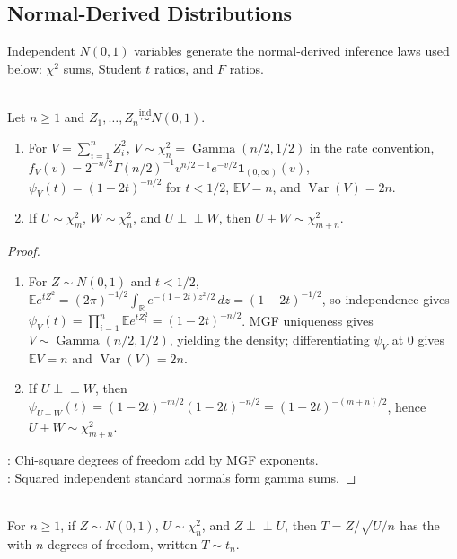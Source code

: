\subsection{Normal-Derived Distributions}

Independent $N(0,1)$ variables generate the normal-derived inference laws used below: $\chi^2$ sums, Student $t$ ratios, and $F$ ratios.

\begin{proposition} \label{prop:chi-square-normal-sums} \\
Let $n\geq1$ and $Z_1,\ldots,Z_n\overset{\mathrm{ind}}{\sim}N(0,1)$.
\begin{enumerate}[label=(\roman*)]
\setlength{\itemsep}{0pt}
\item For $V=\sum_{i=1}^nZ_i^2$, $V\sim\chi_n^2=\operatorname{Gamma}(n/2,1/2)$ in the rate convention,\\
$f_V(v)=2^{-n/2}\Gamma(n/2)^{-1}v^{n/2-1}e^{-v/2}\mathbf{1}_{(0,\infty)}(v)$,\\
$\psi_V(t)=(1-2t)^{-n/2}$ for $t<1/2$, $\mathbb{E}V=n$, and $\operatorname{Var}(V)=2n$.
\item If $U\sim\chi_m^2$, $W\sim\chi_n^2$, and $U\perp\!\!\!\perp W$, then $U+W\sim\chi_{m+n}^2$.
\end{enumerate}
\begin{proof}
\begin{enumerate}[label=(\roman*)]
\setlength{\itemsep}{0pt}
\item
For $Z\sim N(0,1)$ and $t<1/2$, $\mathbb{E}e^{tZ^2}=(2\pi)^{-1/2}\int_{\mathbb{R}}e^{-(1-2t)z^2/2}\,dz=(1-2t)^{-1/2}$, so independence gives $\psi_V(t)=\prod_{i=1}^n\mathbb{E}e^{tZ_i^2}=(1-2t)^{-n/2}$.
MGF uniqueness gives $V\sim\operatorname{Gamma}(n/2,1/2)$, yielding the density; differentiating $\psi_V$ at $0$ gives $\mathbb{E}V=n$ and $\operatorname{Var}(V)=2n$.
\item If $U\perp\!\!\!\perp W$, then $\psi_{U+W}(t)=(1-2t)^{-m/2}(1-2t)^{-n/2}=(1-2t)^{-(m+n)/2}$, hence $U+W\sim\chi_{m+n}^2$.
\end{enumerate}
: Chi-square degrees of freedom add by MGF exponents.\\
: Squared independent standard normals form gamma sums.
\end{proof}
\end{proposition}

\begin{definition} \label{def:student-t-distribution} \\
For $n\geq1$, if $Z\sim N(0,1)$, $U\sim\chi_n^2$, and $Z\perp\!\!\!\perp U$, then $T=Z/\sqrt{U/n}$ has the  with $n$ degrees of freedom, written $T\sim t_n$.
\end{definition}

